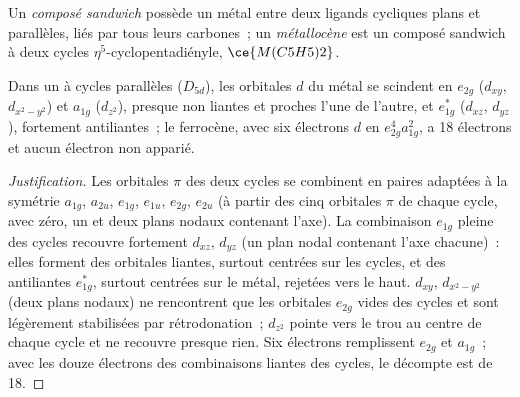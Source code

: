 \begin{definition}[Métallocènes]\label{def:b3:organometallic-bonding:metallocene}
Un \emph{composé sandwich} possède un métal entre deux
ligands cycliques plans et parallèles, liés par tous leurs carbones~; un
\emph{métallocène} est un composé sandwich à deux cycles $\eta^5$-cyclopentadiényle,
$\ce{M(C5H5)2}$.
\end{definition}

\begin{proposition}\label{prop:b3:organometallic-bonding:ferrocene}
Dans un  à cycles parallèles ($D_{5d}$), les orbitales $d$ du métal se scindent en $e_{2g}$
($d_{xy}$, $d_{x^2-y^2}$) et $a_{1g}$ ($d_{z^2}$), presque non liantes et proches l'une de l'autre, et $e_{1g}^\ast$ ($d_{xz}$,
$d_{yz}$), fortement antiliantes~; le ferrocène, avec six électrons $d$ en $e_{2g}^4a_{1g}^2$, a 18
électrons et aucun électron non apparié.
\end{proposition}

\begin{proof}[Justification]
Les orbitales $\pi$ des deux cycles se combinent en paires adaptées à la symétrie $a_{1g}$, $a_{2u}$,
$e_{1g}$, $e_{1u}$, $e_{2g}$, $e_{2u}$ (à partir des cinq orbitales $\pi$ de chaque cycle, avec zéro, un et deux
plans nodaux contenant l'axe). La combinaison $e_{1g}$ pleine des cycles
recouvre fortement $d_{xz}$, $d_{yz}$ (un plan nodal contenant l'axe chacune)~: elles forment des orbitales
liantes, surtout centrées sur les cycles, et des antiliantes $e_{1g}^\ast$, surtout centrées sur le métal, rejetées vers le haut. $d_{xy}$, $d_{x^2-y^2}$
(deux plans nodaux) ne rencontrent que les orbitales $e_{2g}$ vides des cycles
et sont légèrement stabilisées par rétrodonation~; $d_{z^2}$ pointe vers le trou au centre de chaque cycle et
ne recouvre presque rien. Six électrons remplissent $e_{2g}$ et $a_{1g}$~; avec les douze électrons des
combinaisons liantes des cycles, le décompte est de 18.
\end{proof}

